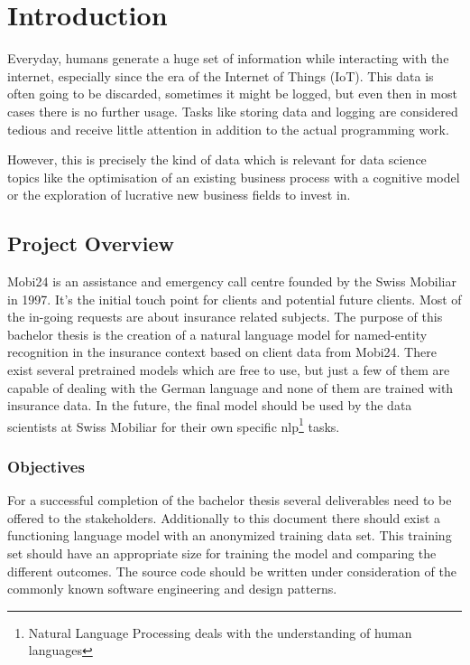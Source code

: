 \chapter{Introduction}

Everyday, humans generate a huge set of information while interacting with the internet, especially since the era of the
Internet of Things (IoT). This data is often going to be discarded, sometimes it might be logged, but even then in most
cases there is no further usage. Tasks like storing data and logging are considered tedious and receive little attention
in addition to the actual programming work.

However, this is precisely the kind of data which is relevant for data science topics like the optimisation of an existing
business process with a cognitive model or the exploration of lucrative new business fields to invest in.

\section{Project Overview}

Mobi24 is an assistance and emergency call centre founded by the Swiss Mobiliar in 1997. It's the initial touch point for
clients and potential future clients. Most of the in-going requests are about insurance related subjects. The purpose of
this bachelor thesis is the creation of a natural language model for named-entity recognition in the insurance context
based on client data from Mobi24. There exist several pretrained models which are free to use, but just a few of them are
capable of dealing with the German language and none of them are trained with insurance data. In the future, the final model
should be used by the data scientists at Swiss Mobiliar for their own specific \acrshort{nlp}\footnote{Natural Language Processing deals
with the understanding of human languages} tasks.

\subsection{Objectives}

For a successful completion of the bachelor thesis several deliverables need to be offered to the stakeholders. Additionally
to this document there should exist a functioning language model with an anonymized training data set. This training set
should have an appropriate size for training the model and comparing the different outcomes. The source code should be
written under consideration of the commonly known software engineering and design patterns.

